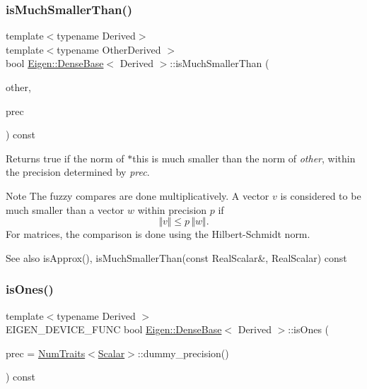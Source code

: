 \subsubsection{\texorpdfstring{isMuchSmallerThan()}{isMuchSmallerThan()}\hspace{0.1cm}{\footnotesize\ttfamily [2/2]}}
{\footnotesize\ttfamily template$<$typename Derived$>$ \\
template$<$typename Other\+Derived $>$ \\
bool \mbox{\hyperlink{class_eigen_1_1_dense_base}{Eigen\+::\+Dense\+Base}}$<$ Derived $>$\+::is\+Much\+Smaller\+Than (\begin{DoxyParamCaption}\item[{const \mbox{\hyperlink{class_eigen_1_1_dense_base}{Dense\+Base}}$<$ Other\+Derived $>$ \&}]{other,  }\item[{const Real\+Scalar \&}]{prec }\end{DoxyParamCaption}) const}

\begin{DoxyReturn}{Returns}
{\ttfamily true} if the norm of {\ttfamily $\ast$this} is much smaller than the norm of {\itshape other}, within the precision determined by {\itshape prec}.
\end{DoxyReturn}
\begin{DoxyNote}{Note}
The fuzzy compares are done multiplicatively. A vector $ v $ is considered to be much smaller than a vector $ w $ within precision $ p $ if \[ \Vert v \Vert \leqslant p\,\Vert w\Vert. \] For matrices, the comparison is done using the Hilbert-\/\+Schmidt norm.
\end{DoxyNote}
\begin{DoxySeeAlso}{See also}
is\+Approx(), is\+Much\+Smaller\+Than(const Real\+Scalar\&, Real\+Scalar) const 
\end{DoxySeeAlso}
\mbox{\label{class_eigen_1_1_dense_base_a91fb1c80e1fd4970a16fd509764225d7}} 
\subsubsection{\texorpdfstring{isOnes()}{isOnes()}}
{\footnotesize\ttfamily template$<$typename Derived $>$ \\
E\+I\+G\+E\+N\+\_\+\+D\+E\+V\+I\+C\+E\+\_\+\+F\+U\+NC bool \mbox{\hyperlink{class_eigen_1_1_dense_base}{Eigen\+::\+Dense\+Base}}$<$ Derived $>$\+::is\+Ones (\begin{DoxyParamCaption}\item[{const Real\+Scalar \&}]{prec = {\ttfamily \mbox{\hyperlink{struct_eigen_1_1_num_traits}{Num\+Traits}}$<$\mbox{\hyperlink{class_eigen_1_1_dense_base_a5feed465b3a8e60c47e73ecce83e39a2}{Scalar}}$>$\+:\+:dummy\+\_\+precision()} }\end{DoxyParamCaption}) const}

